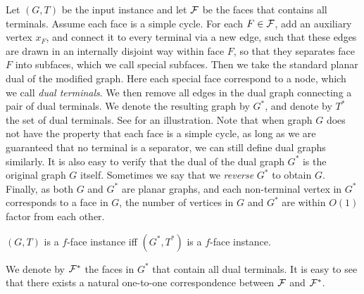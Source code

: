 Let $(G,T)$ be the input instance and let ${\mathcal{F}}$ be the faces that contains all terminals.
Assume each face is a simple cycle. For each $F\in {\mathcal{F}}$, add an auxiliary vertex $x_F$, and connect it to every terminal via a new edge, such that these edges are drawn in an internally disjoint way within face $F$, so that they separates face $F$ into subfaces, which we call special subfaces. Then we take the standard planar dual of the modified graph.
Here each special face correspond to a node, which we call \emph{dual terminals}. We then remove all edges in the dual graph connecting a pair of dual terminals. We denote the resulting graph by $G^*$, and denote by $T^*$ the set of dual terminals. See  for an illustration.
Note that when graph $G$ does not have the property that each face is a simple cycle, as long as we are guaranteed that no terminal is a separator, we can still define dual graphs similarly.
It is also easy to verify that the dual of the dual graph $G^*$ is the original graph $G$ itself. Sometimes we say that we \emph{reverse} $G^*$ to obtain $G$.
Finally, as both $G$ and $G^*$ are planar graphs, and each non-terminal vertex in $G^*$ corresponds to a face in $G$, the number of vertices in $G$ and $G^*$ are within $O(1)$ factor from each other.


\begin{observation}
	$(G,T)$ is a $f$-face instance iff $(G^*,T^*)$ is a $f$-face instance.
\end{observation}
We denote by ${\mathcal{F}}^*$ the faces in $G^*$ that contain all dual terminals. It is easy to see that there exists a natural one-to-one correspondence between ${\mathcal{F}}$ and ${\mathcal{F}}^*$.

